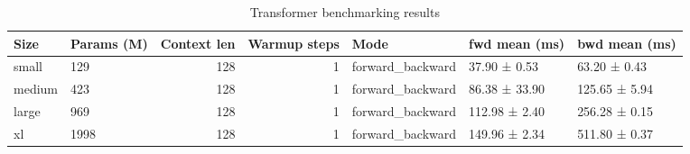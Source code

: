 \begin{table}
\caption{Transformer benchmarking results}
\label{tab:benchmarks}
\begin{tabular}{llrrlll}
\toprule
Size & Params (M) & Context len & Warmup steps & Mode & fwd mean (ms) & bwd mean (ms) \\
\midrule
small & 129 & 128 & 1 & forward_backward & 37.90 ± 0.53 & 63.20 ± 0.43 \\
medium & 423 & 128 & 1 & forward_backward & 86.38 ± 33.90 & 125.65 ± 5.94 \\
large & 969 & 128 & 1 & forward_backward & 112.98 ± 2.40 & 256.28 ± 0.15 \\
xl & 1998 & 128 & 1 & forward_backward & 149.96 ± 2.34 & 511.80 ± 0.37 \\
\bottomrule
\end{tabular}
\end{table}

